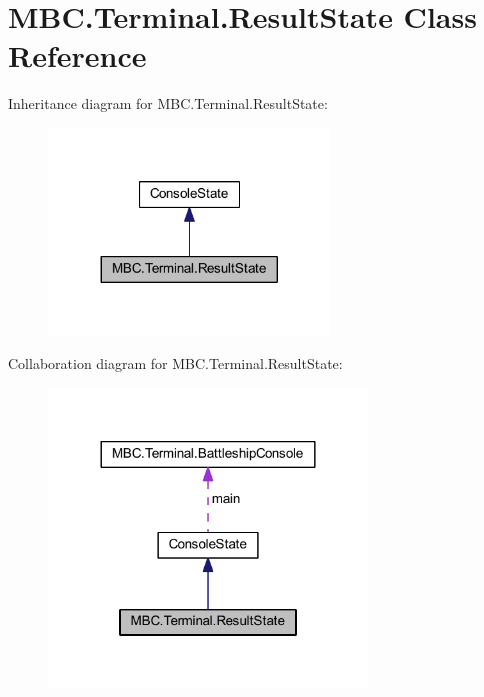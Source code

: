 \hypertarget{class_m_b_c_1_1_terminal_1_1_result_state}{\section{M\-B\-C.\-Terminal.\-Result\-State Class Reference}
\label{class_m_b_c_1_1_terminal_1_1_result_state}
}


Inheritance diagram for M\-B\-C.\-Terminal.\-Result\-State\-:\nopagebreak
\begin{figure}[H]
\begin{center}
\leavevmode
\includegraphics[width=212pt]{class_m_b_c_1_1_terminal_1_1_result_state__inherit__graph}
\end{center}
\end{figure}


Collaboration diagram for M\-B\-C.\-Terminal.\-Result\-State\-:\nopagebreak
\begin{figure}[H]
\begin{center}
\leavevmode
\includegraphics[width=240pt]{class_m_b_c_1_1_terminal_1_1_result_state__coll__graph}
\end{center}
\end{figure}
